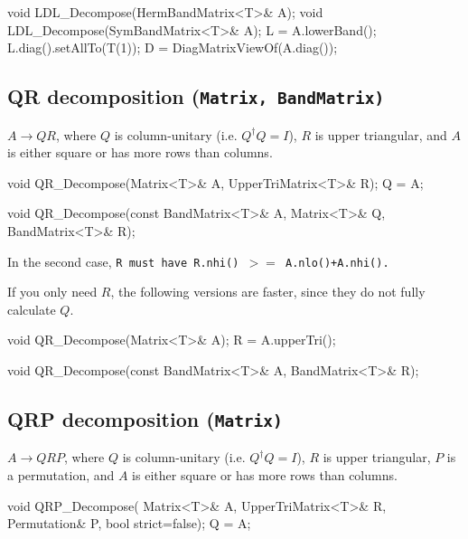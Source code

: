 \begin{tmvcode}
void LDL_Decompose(HermBandMatrix<T>& A);
void LDL_Decompose(SymBandMatrix<T>& A);
L = A.lowerBand();
L.diag().setAllTo(T(1));
D = DiagMatrixViewOf(A.diag());
\end{tmvcode}

\subsection[QR decomposition] {QR decomposition \rm (\tt{Matrix}, \tt{BandMatrix})}

$A \rightarrow Q R$, where $Q$ is column-unitary 
(i.e. $Q^\dagger Q = I$), $R$ is upper triangular, and $A$ is either square or 
has more rows than columns.

\begin{tmvcode}
void QR_Decompose(Matrix<T>& A, UpperTriMatrix<T>& R);
Q = A;

void QR_Decompose(const BandMatrix<T>& A, Matrix<T>& Q, BandMatrix<T>& R);
\end{tmvcode}
In the second case, \tt{R} must have \tt{R.nhi()} $>=$ \tt{A.nlo()+A.nhi()}.

If you only need $R$, the following versions are faster, since they do 
not fully calculate $Q$.
\begin{tmvcode}
void QR_Decompose(Matrix<T>& A);
R = A.upperTri();

void QR_Decompose(const BandMatrix<T>& A, BandMatrix<T>& R);
\end{tmvcode}

\subsection[QRP decomposition] {QRP decomposition \rm (\tt{Matrix})}

$A \rightarrow Q R P$, where $Q$ is column-unitary 
(i.e. $Q^\dagger Q = I$), $R$ is upper triangular, $P$ is a permutation, 
and $A$ is either square or has more rows than columns.

\begin{tmvcode}
void QRP_Decompose(
      Matrix<T>& A, UpperTriMatrix<T>& R, Permutation& P, 
      bool strict=false);
Q = A;
\end{tmvcode}

